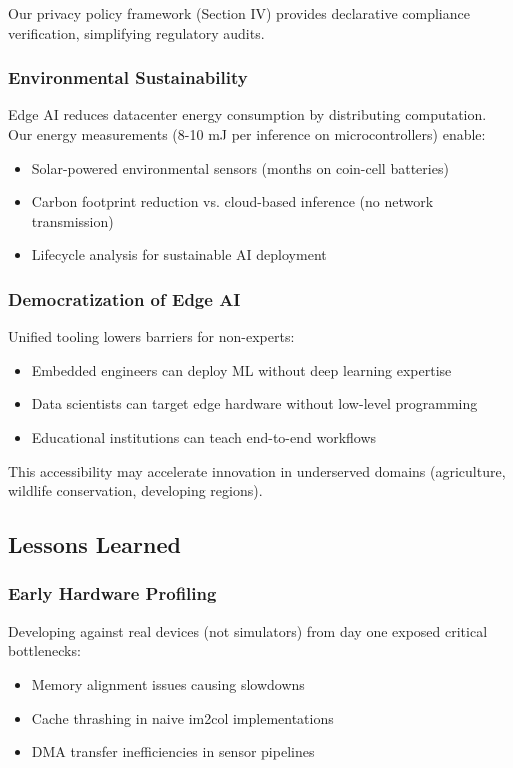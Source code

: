 Our privacy policy framework (Section IV) provides declarative compliance verification, simplifying regulatory audits.

\subsubsection{Environmental Sustainability}
Edge AI reduces datacenter energy consumption by distributing computation. Our energy measurements (8-10 mJ per inference on microcontrollers) enable:
\begin{itemize}
\item Solar-powered environmental sensors (months on coin-cell batteries)
\item Carbon footprint reduction vs. cloud-based inference (no network transmission)
\item Lifecycle analysis for sustainable AI deployment
\end{itemize}

\subsubsection{Democratization of Edge AI}
Unified tooling lowers barriers for non-experts:
\begin{itemize}
\item Embedded engineers can deploy ML without deep learning expertise
\item Data scientists can target edge hardware without low-level programming
\item Educational institutions can teach end-to-end workflows
\end{itemize}

This accessibility may accelerate innovation in underserved domains (agriculture, wildlife conservation, developing regions).

\subsection{Lessons Learned}

\subsubsection{Early Hardware Profiling}
Developing against real devices (not simulators) from day one exposed critical bottlenecks:
\begin{itemize}
\item Memory alignment issues causing slowdowns
\item Cache thrashing in naive im2col implementations
\item DMA transfer inefficiencies in sensor pipelines
\end{itemize}

